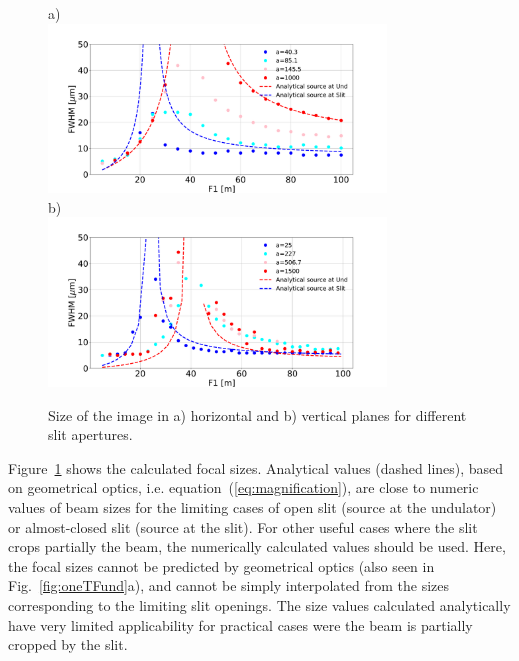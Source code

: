 \documentclass{osa-article}
\begin{document}
\begin{figure}[H]
a)\\
\hspace{-2.0cm}
    \includegraphics[width=0.80\textwidth]{sizes_h-eps-converted-to.pdf}\\
b)\\
\hspace{-2.0cm}
    \includegraphics[width=0.80\textwidth]{sizes_v-eps-converted-to.pdf}

    \caption{
    \label{fig:focalSizes}
    Size of the image in a) horizontal and b) vertical planes for different slit apertures.
    }
\end{figure}

Figure~\ref{fig:focalSizes} shows the calculated focal sizes. Analytical values (dashed lines), based on geometrical optics, i.e. equation~(\ref{eq:magnification}), are close to numeric values of beam sizes for the limiting cases of open slit (source at the undulator) or almost-closed slit (source at the slit). For other useful cases where the slit crops partially the beam, the numerically calculated values should be used. Here, the focal sizes cannot be predicted by geometrical optics (also seen in Fig.~\ref{fig:oneTFund}a), and cannot be simply interpolated from the sizes corresponding to the limiting slit openings. The size values calculated analytically have very limited applicability for practical cases were the beam is partially cropped by the slit. 
\end{document}
